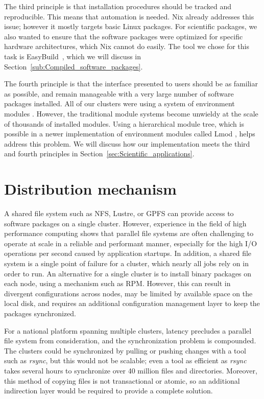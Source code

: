 \documentclass[sigconf]{acmart}
\begin{document}
The third principle is that installation procedures should be tracked and reproducible. This means that automation is needed. Nix already addresses this issue; however it mostly targets basic Linux packages. For scientific packages, we also wanted to ensure that the software packages were optimized for specific hardware architectures, which Nix cannot do easily. The tool we chose for this task is EasyBuild~\cite{EasyBuild2012,EasyBuild2014,EasyBuild2016}, which we will discuss in Section~\ref{sub:Compiled_software_packages}.

The fourth principle is that the interface presented to users should be as familiar as possible, and remain manageable with a very large number of software packages installed. All of our clusters were using a system of environment modules \cite{Modules1991,Modules1996}. However, the traditional module systems become unwieldy at the scale of thousands of installed modules. Using a hierarchical module tree, which is possible in a newer implementation of environment modules called Lmod \cite{Lmod}, helps address this problem. We will discuss how our implementation meets the third and fourth principles in Section~\ref{sec:Scientific_applications}.

\section{Distribution mechanism}
\label{sec:Distribution_mechanism}
A shared file system such as NFS, Lustre, or GPFS can provide access to software packages on a single cluster. However, experience in the field of high performance computing shows that parallel file systems are often challenging to operate at scale in a reliable and performant manner, especially for the high I/O operations per second caused by application startups. In addition, a shared file system is a single point of failure for a cluster, which nearly all jobs rely on in order to run. An alternative for a single cluster is to install binary packages on each node, using a mechanism such as RPM. However, this can result in divergent configurations across nodes, may be limited by available space on the local disk, and requires an additional configuration management layer to keep the packages synchronized. 

For a national platform spanning multiple clusters, latency precludes a parallel file system from consideration, and the synchronization problem is compounded. The clusters could be synchronized by pulling or pushing changes with a tool such as {\it rsync}, but this would not be scalable; even a tool as efficient as {\it rsync} takes several hours to synchronize over 40 million files and directories. Moreover, this method of copying files is not transactional or atomic, so an additional indirection layer would be required to provide a complete solution.
\end{document}

